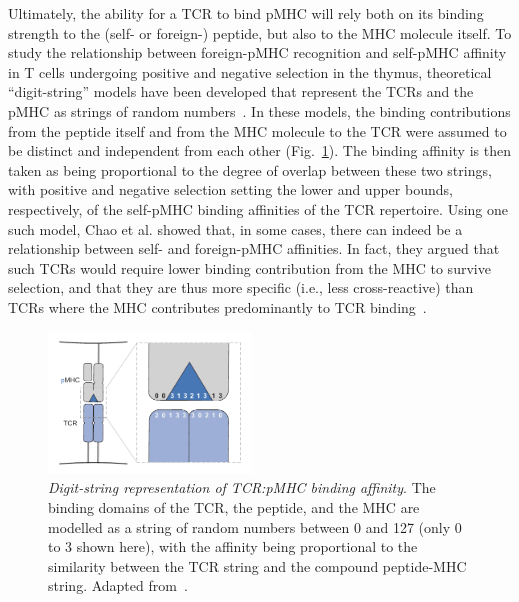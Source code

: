 Ultimately, the ability for a TCR to bind pMHC will rely both on its binding strength to the (self- or foreign-) peptide, but also to the MHC molecule itself. To study the relationship between foreign-pMHC recognition and self-pMHC affinity in T cells undergoing positive and negative selection in the thymus, theoretical ``digit-string'' models have been developed that represent the TCRs and the pMHC as strings of random numbers~\cite{detours1999explaining,detours2000paradox,chao2005effects}. In these models, the binding contributions from the peptide itself and from the MHC molecule to the TCR were assumed to be distinct and independent from each other (Fig.~\ref{fig:intro_digitString}). The binding affinity is then taken as being proportional to the degree of overlap between these two strings, with positive and negative selection setting the lower and upper bounds, respectively, of the self-pMHC binding affinities of the TCR repertoire. Using one such model, Chao et al. showed that, in some cases, there can indeed be a relationship between self- and foreign-pMHC affinities. In fact, they argued that such TCRs would require lower binding contribution from the MHC to survive selection, and that they are thus more specific (i.e., less cross-reactive) than TCRs where the MHC contributes predominantly to TCR binding~\cite{chao2005effects}.
%
\begin{figure}
    \centering
    \includegraphics[width=0.48\textwidth]{Figures/intro/fig7_digitString.pdf}
    \caption[Digit-string representation of TCR:pMHC binding affinity]{%
    \textit{Digit-string representation of TCR:pMHC binding affinity}. %
    The binding domains of the TCR, the peptide, and the MHC are modelled as a string of random numbers between 0 and 127 (only 0 to 3 shown here), with the affinity being proportional to the similarity between the TCR string and the compound peptide-MHC string. Adapted from~\cite{chao2005effects}.}
    \label{fig:intro_digitString}
\end{figure}

